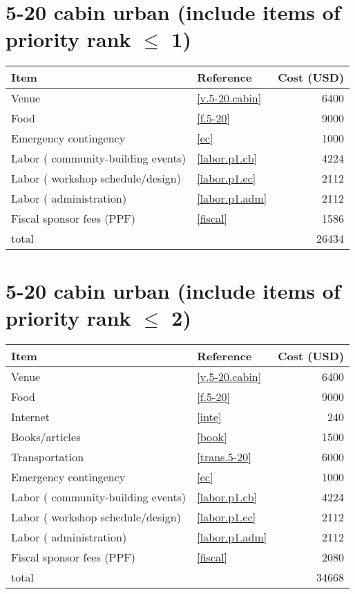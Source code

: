 \section*{5-20 cabin urban (include items of priority rank $\leq$ 1)}
\begin{center}
\begin{tabular}{llr}
Item & Reference & Cost (USD) \\ \hline
Venue & \ref{v.5-20.cabin} & 6400 \\
Food & \ref{f.5-20} & 9000 \\
Emergency contingency & \ref{ec} & 1000 \\
Labor ( community-building events) & \ref{labor.p1.cb} & 4224 \\
Labor ( workshop schedule/design) & \ref{labor.p1.ec} & 2112 \\
Labor ( administration) & \ref{labor.p1.adm} & 2112 \\
Fiscal sponsor fees (PPF) & \ref{fiscal} & 1586 \\ \hline
total &  & 26434
\end{tabular}
\end{center}
\newpage
\section*{5-20 cabin urban (include items of priority rank $\leq$ 2)}
\begin{center}
\begin{tabular}{llr}
Item & Reference & Cost (USD) \\ \hline
Venue & \ref{v.5-20.cabin} & 6400 \\
Food & \ref{f.5-20} & 9000 \\
Internet & \ref{inte} & 240 \\
Books/articles & \ref{book} & 1500 \\
Transportation & \ref{trans.5-20} & 6000 \\
Emergency contingency & \ref{ec} & 1000 \\
Labor ( community-building events) & \ref{labor.p1.cb} & 4224 \\
Labor ( workshop schedule/design) & \ref{labor.p1.ec} & 2112 \\
Labor ( administration) & \ref{labor.p1.adm} & 2112 \\
Fiscal sponsor fees (PPF) & \ref{fiscal} & 2080 \\ \hline
total &  & 34668
\end{tabular}
\end{center}
\newpage
